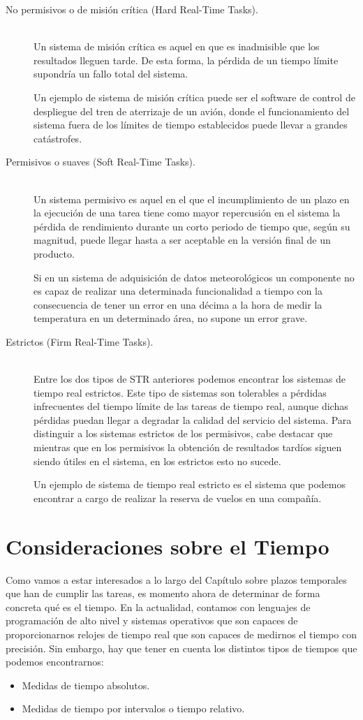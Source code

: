 \begin{description}
    \item [No permisivos o de misión crítica (Hard Real-Time Tasks).]~\\
        Un sistema de misión crítica es aquel en que es inadmisible que los resultados lleguen tarde. De esta forma, la pérdida de un tiempo límite supondría un fallo total del sistema.

        Un ejemplo de sistema de misión crítica puede ser el software de control de despliegue del tren de aterrizaje de un avión, donde el funcionamiento del sistema fuera de los límites de tiempo establecidos puede llevar a grandes catástrofes.
    \item [Permisivos o suaves (Soft Real-Time Tasks).]~\\
        Un sistema permisivo es aquel en el que el incumplimiento de un plazo en la ejecución de una tarea tiene como mayor repercusión en el sistema la pérdida de rendimiento durante un corto periodo de tiempo que, según su magnitud, puede llegar hasta a ser aceptable en la versión final de un producto.

        Si en un sistema de adquisición de datos meteorológicos un componente no es capaz de realizar una determinada funcionalidad a tiempo con la consecuencia de tener un error en una décima a la hora de medir la temperatura en un determinado área, no supone un error grave.
    \item [Estrictos (Firm Real-Time Tasks).]~\\
        Entre los dos tipos de STR anteriores podemos encontrar los sistemas de tiempo real estrictos. Este tipo de sistemas son tolerables a pérdidas infrecuentes del tiempo límite de las tareas de tiempo real, aunque dichas pérdidas puedan llegar a degradar la calidad del servicio del sistema. Para distinguir a los sistemas estrictos de los permisivos, cabe destacar que mientras que en los permisivos la obtención de resultados tardíos siguen siendo útiles en el sistema, en los estrictos esto no sucede.

        Un ejemplo de sistema de tiempo real estricto es el sistema que podemos encontrar a cargo de realizar la reserva de vuelos en una compañía.
\end{description}

\section{Consideraciones sobre el Tiempo}
Como vamos a estar interesados a lo largo del Capítulo sobre plazos temporales que han de cumplir las tareas, es momento ahora de determinar de forma concreta qué es el tiempo. En la actualidad, contamos con lenguajes de programación de alto nivel y sistemas operativos que son capaces de proporcionarnos relojes de tiempo real que son capaces de medirnos el tiempo con precisión. Sin embargo, hay que tener en cuenta los distintos tipos de tiempos que podemos encontrarnos:
\begin{itemize}
    \item Medidas de tiempo absolutos.
    \item Medidas de tiempo por intervalos o tiempo relativo.
\end{itemize}

